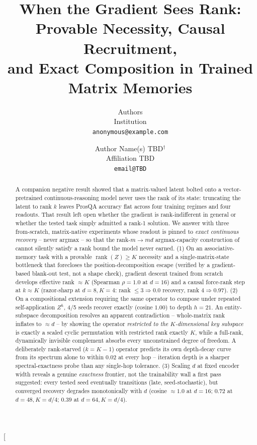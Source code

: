 \documentclass[10pt,twocolumn,letterpaper]{article}
\title{When the Gradient Sees Rank: Provable Necessity, Causal Recruitment,\\
and Exact Composition in Trained Matrix Memories}
\author{\anonymous{} Authors\\
  \anonymous{} Institution\\
  \texttt{anonymous@example.com}}
\author{Author Name(s) TBD$^{\dagger}$\\
  Affiliation TBD\\
  \texttt{email@TBD}}
\date{}
\newcommand{\rank}{\operatorname{rank}}
\begin{document}
\twocolumn[
\begin{@twocolumnfalse}
\maketitle
\begin{abstract}
A companion negative result showed that a matrix-valued latent bolted onto a
vector-pretrained continuous-reasoning model never uses the rank of its
state: truncating the latent to rank $k$ leaves ProsQA accuracy flat across
four training regimes and four readouts. That result left open whether the
gradient is rank-indifferent in general or whether the tested task simply
admitted a rank-1 solution. We answer with three from-scratch,
matrix-native experiments whose readout is pinned to \emph{exact continuous
recovery} -- never argmax -- so that the rank-$m\!\to\!md$ argmax-capacity
construction of \citet{nichani2025factual} cannot silently satisfy a rank
bound the model never earned. (1) On an associative-memory task with a
provable $\rank(Z)\geq K$ necessity and a single-matrix-state bottleneck
that forecloses the position-decomposition escape (verified by a
gradient-based blank-out test, not a shape check), gradient descent trained
from scratch develops effective rank $\approx K$ (Spearman
$\rho\!=\!1.0$ at $d\!=\!16$) and a causal force-rank step at $k\!\approx\!K$
(razor-sharp at $d\!=\!8,K\!=\!4$: rank $\leq 3\Rightarrow 0.0$ recovery,
rank $4\Rightarrow 0.97$). (2) On a compositional extension requiring the
same operator to compose under repeated self-application $Z^h$, 4/5 seeds
recover exactly (cosine $1.00$) to depth $h\!=\!21$. An entity-subspace
decomposition resolves an apparent contradiction -- whole-matrix rank
inflates to $\approx d$ -- by showing the operator \emph{restricted to the
$K$-dimensional key subspace} is exactly a scaled cyclic permutation with
restricted rank exactly $K$, while a full-rank, dynamically invisible
complement absorbs every unconstrained degree of freedom. A deliberately
rank-starved ($k\!=\!K\!-\!1$) operator predicts its own depth-decay curve
from its spectrum alone to within $0.02$ at every hop -- iteration depth is
a sharper spectral-exactness probe than any single-hop tolerance. (3)
Scaling $d$ at fixed encoder width reveals a genuine \emph{exactness}
frontier, not the trainability wall a first pass suggested: every tested
seed eventually transitions (late, seed-stochastic), but converged
recovery degrades monotonically with $d$ (cosine $\approx\!1.0$ at
$d\!=\!16$; $0.72$ at $d\!=\!48,K\!=\!d/4$; $0.39$ at $d\!=\!64,K\!=\!d/4$).

\end{abstract}
\end{@twocolumnfalse}
\end{document}
